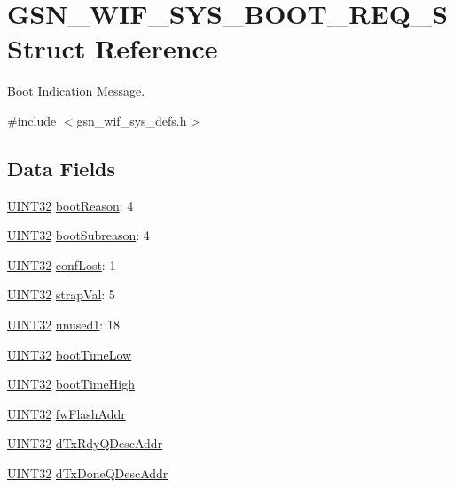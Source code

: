 \hypertarget{a00348}{
\section{GSN\_\-WIF\_\-SYS\_\-BOOT\_\-REQ\_\-S Struct Reference}
\label{a00348}
}


Boot Indication Message.  




{\ttfamily \#include $<$gsn\_\-wif\_\-sys\_\-defs.h$>$}

\subsection*{Data Fields}
\begin{DoxyCompactItemize}
\item 
\hyperlink{a00660_gae1e6edbbc26d6fbc71a90190d0266018}{UINT32} \hyperlink{a00348_a81df1b1a967faea76636f64e7ebf3f4e}{bootReason}: 4
\item 
\hyperlink{a00660_gae1e6edbbc26d6fbc71a90190d0266018}{UINT32} \hyperlink{a00348_a7ca6fad2381173efde7ef12e9c546923}{bootSubreason}: 4
\item 
\hyperlink{a00660_gae1e6edbbc26d6fbc71a90190d0266018}{UINT32} \hyperlink{a00348_ad81cf810d5479c72eb00a2dae02d1bfb}{confLost}: 1
\item 
\hyperlink{a00660_gae1e6edbbc26d6fbc71a90190d0266018}{UINT32} \hyperlink{a00348_a325947d5876bcd21082a678746f5810c}{strapVal}: 5
\item 
\hyperlink{a00660_gae1e6edbbc26d6fbc71a90190d0266018}{UINT32} \hyperlink{a00348_a186854790696dd9afc23f7648fa363ed}{unused1}: 18
\item 
\hyperlink{a00660_gae1e6edbbc26d6fbc71a90190d0266018}{UINT32} \hyperlink{a00348_ac4320494d78b18891e3da4896e6ab01d}{bootTimeLow}
\item 
\hyperlink{a00660_gae1e6edbbc26d6fbc71a90190d0266018}{UINT32} \hyperlink{a00348_ab360fb81514af95b2c567b11bc326d72}{bootTimeHigh}
\item 
\hyperlink{a00660_gae1e6edbbc26d6fbc71a90190d0266018}{UINT32} \hyperlink{a00348_a227fcb5ac22283fc4d90e07a8363f7a5}{fwFlashAddr}
\item 
\hyperlink{a00660_gae1e6edbbc26d6fbc71a90190d0266018}{UINT32} \hyperlink{a00348_a2e68778dde03015909b732c4e317c01f}{dTxRdyQDescAddr}
\item 
\hyperlink{a00660_gae1e6edbbc26d6fbc71a90190d0266018}{UINT32} \hyperlink{a00348_a78d96dc01c76349b87f960ba482cac23}{dTxDoneQDescAddr}

\end{DoxyCompactItemize}
